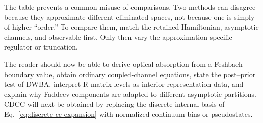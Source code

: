 The table prevents a common misuse of comparisons.  Two methods can disagree
because they approximate different eliminated spaces, not because one is
simply of higher ``order.''  To compare them, match the retained Hamiltonian,
asymptotic channels, and observable first.  Only then vary the approximation
specific regulator or truncation.

\begin{checkpointbox}
The reader should now be able to derive optical absorption from a Feshbach
boundary value, obtain ordinary coupled-channel equations, state the
post--prior test of DWBA, interpret R-matrix levels as interior representation
data, and explain why Faddeev components are adapted to different asymptotic
partitions.  CDCC will next be obtained by replacing the discrete internal
basis of Eq.~\eqref{eq:discrete-cc-expansion} with normalized continuum bins or
pseudostates.
\end{checkpointbox}
